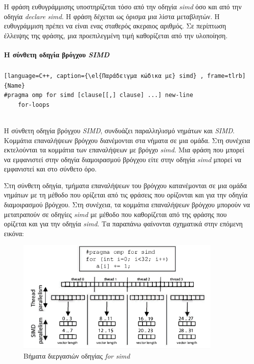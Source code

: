 \documentclass[12pt]{article}
\newcommand{\en}[1]{\foreignlanguage{english}{#1}}
\newcommand{\el}[1]{\selectlanguage{greek}{#1}\selectlanguage{english}}
\begin{document}
Η φράση ευθυγράμμισης υποστηρίζεται τόσο από την οδηγία \emph{\en{simd}} όσο και από την οδηγία \emph{\en{declare simd}}. Η φράση δέχεται ως όρισμα μια λίστα μεταβλητών. Η ευθυγράμμιση πρέπει να είναι ενας σταθερός ακεραιος αριθμός. Σε περίπτωση έλλειψης της φράσης, μια προεπιλεγμένη τιμή καθορίζεται από την υλοποίηση.

\paragraph{Η σύνθετη οδηγία βρόγχου \emph{\en{SIMD}}}
\subparagraph{}

\begin{lstlisting}[language=C++, caption={\el{Παράδειγμα κώδικα με} simd} , frame=tlrb]{Name}
#pragma omp for simd [clause[[,] clause] ...] new-line
	for-loops
\end{lstlisting}

\ \\
Η σύνθετη οδηγία βρόγχου \emph{\en{SIMD}}, συνδυάζει παραλληλισμό νημάτων και \emph{\en{SIMD}}. Κομμάτια επαναλήψεων βρόγχου διανέμονται στα νήματα σε μια ομάδα. Στη συνέχεια εκτελούνται τα κομμάτια των επαναλήψεων με βρόγχο \emph{\en{simd}}. Μια φράση που μπορεί να εμφανιστεί στην οδηγία διαμοιρασμού βρόγχου είτε στην οδηγία \emph{\en{simd}} μπορεί να εμφανιστεί και στο σύνθετο όρο.

Στη σύνθετη οδηγία, τμήματα επαναλήψεων του βρόγχου κατανέμονται σε μια ομάδα νημάτων με τη μέθοδο που ορίζεται από τις φράσεις που ορίζονται και για την οδηγία διαμοιρασμού βρόγχου. Στη συνέχεια, τα κομμάτια επαναλήψεων βρόγχου μπορούν να μετατραπούν σε οδηγίες \emph{\en{simd}} με μέθοδο που καθορίζεται από της φράσης που ορίζεται και για την οδηγία \emph{\en{simd}}. Τα παραπάνω φαίνονται σχηματικά στην επόμενη εικόνα:
\ \\
\begin{figure}[h]
\includegraphics[width=0.9\textwidth]{for_simd}
\centering
\captionsetup{justification=centering, singlelinecheck=false}
	\caption{ Βήματα διεργασιών οδηγίας \emph{\en{for simd}}}
\label{fig:for_simd}
\end{figure}
\end{document}
